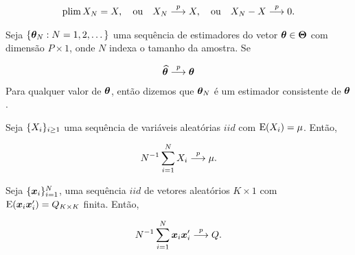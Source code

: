 \documentclass[11pt, oneside, a4paper, article]{article}
\numberwithin{equation}{section}
\begin{document}
\begin{description}
\begin{defn}
\vspace{-1 em}
\begin{align*}
\text{plim} \, X_{N} = X,
\quad \text{ou}	\quad
X_{N}  \overset{p}{\longrightarrow}  X,
\quad \text{ou}	\quad
X_{N} - X  \overset{p}{\longrightarrow}  0.
\end{align*}
\end{defn}

\begin{defn}
\citet[Def 3.8, p.40 ]{wool-2010}

Seja $\{\boldsymbol{\theta}_{N}: N=1, 2, \dots\}$ uma sequência de estimadores do vetor $\boldsymbol{\theta} \in \boldsymbol{\Theta}$ com dimensão $P \times 1$, onde $N$ indexa o tamanho da amostra.
Se

\vspace{-1 em}
\begin{align} \label{consist}
\widehat{\boldsymbol{\theta}} \overset{p}{\longrightarrow} \boldsymbol{\theta}
\end{align}
Para qualquer valor de $\boldsymbol{\theta}$, então dizemos que $\boldsymbol{\theta}_{N}$ é um estimador consistente de $\boldsymbol{\theta}$.
\end{defn}

\begin{teo} \label{teo:lgn}

Seja $\{X_{i}\}_{i \geq 1}$ uma sequência de variáveis aleatórias $iid$ com $\text{E}(X_{i}) = \mu$.
Então, 

\vspace{-1 em}
\begin{align*}
	N^{-1} \sum_{i=1}^{N} X_{i}  \overset{p}{\longrightarrow}  \mu.
\end{align*}
\end{teo}

\begin{teo} \label{teo:lgn:mat:1}

Seja $\{\boldsymbol{x}_{i}\}_{i=1}^{N}$, uma sequência $iid$ de vetores aleatórios $K \times 1$ com $\text{E}(\boldsymbol{x}_{i} \boldsymbol{x}_{i}') = Q_{K \times K}$ finita.
Então, 

\vspace{-1 em}
\begin{align*}
N^{-1} \sum_{i=1}^{N}
\boldsymbol{x}_{i} \boldsymbol{x}_{i}'
 \overset{p}{\longrightarrow}  Q.
\end{align*}


\end{teo}
\end{description}
\end{document}
